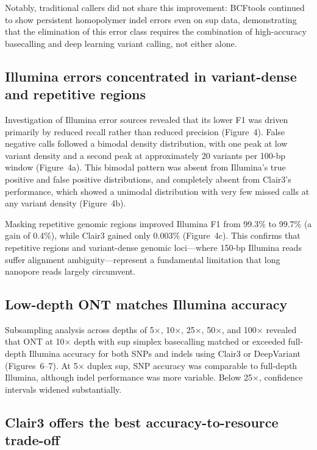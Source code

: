 \documentclass[11pt]{article}
\begin{document}
Notably, traditional callers did not share this improvement: BCFtools continued to show persistent homopolymer indel errors even on sup data, demonstrating that the elimination of this error class requires the combination of high-accuracy basecalling and deep learning variant calling, not either alone.

\subsection{Illumina errors concentrated in variant-dense and repetitive regions}

Investigation of Illumina error sources revealed that its lower F1 was driven primarily by reduced recall rather than reduced precision (Figure~4). False negative calls followed a bimodal density distribution, with one peak at low variant density and a second peak at approximately 20 variants per 100-bp window (Figure~4a). This bimodal pattern was absent from Illumina's true positive and false positive distributions, and completely absent from Clair3's performance, which showed a unimodal distribution with very few missed calls at any variant density (Figure~4b).

Masking repetitive genomic regions improved Illumina F1 from 99.3\% to 99.7\% (a gain of 0.4\%), while Clair3 gained only 0.003\% (Figure~4c). This confirms that repetitive regions and variant-dense genomic loci---where 150-bp Illumina reads suffer alignment ambiguity---represent a fundamental limitation that long nanopore reads largely circumvent.

\subsection{Low-depth ONT matches Illumina accuracy}

Subsampling analysis across depths of 5$\times$, 10$\times$, 25$\times$, 50$\times$, and 100$\times$ revealed that ONT at 10$\times$ depth with sup simplex basecalling matched or exceeded full-depth Illumina accuracy for both SNPs and indels using Clair3 or DeepVariant (Figures~6--7). At 5$\times$ duplex sup, SNP accuracy was comparable to full-depth Illumina, although indel performance was more variable. Below 25$\times$, confidence intervals widened substantially.

\subsection{Clair3 offers the best accuracy-to-resource trade-off}
\end{document}
